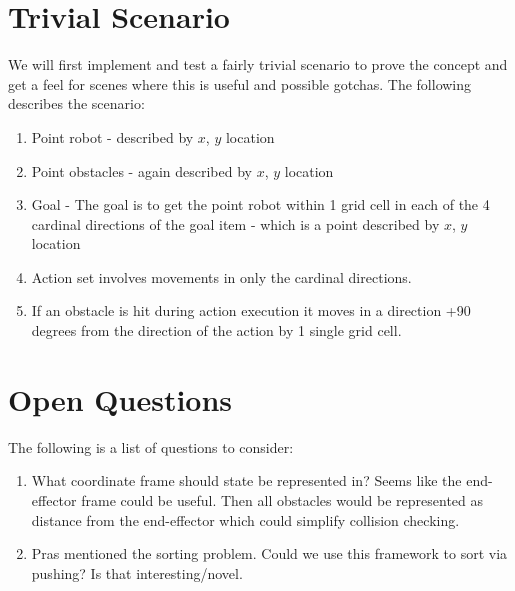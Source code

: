 \documentclass[11pt, oneside]{article}   	%
\begin{document}
\section*{Trivial Scenario}
We will first implement and test a fairly trivial scenario to prove the concept and get a feel for scenes where this is useful and possible gotchas.   The following describes the scenario:
\begin{enumerate}
\item Point robot - described by $x$, $y$ location
\item Point obstacles - again described by $x$, $y$ location
\item Goal - The goal is to get the point robot within 1 grid cell in each of the 4 cardinal directions of the goal item - which is a point described by $x$, $y$ location
\item Action set involves movements in only the cardinal directions.
\item If an obstacle is hit during action execution it moves in a direction +90 degrees from the direction of the action by 1 single grid cell.
\end{enumerate}

\section*{Open Questions}
The following is a list of questions to consider:
\begin{enumerate}
\item What coordinate frame should state be represented in? Seems like the end-effector frame could be useful.  Then all obstacles would be represented as distance from the end-effector which could simplify collision checking.
\item Pras mentioned the sorting problem.  Could we use this framework to sort via pushing? Is that interesting/novel.
\end{enumerate}
\end{document}
